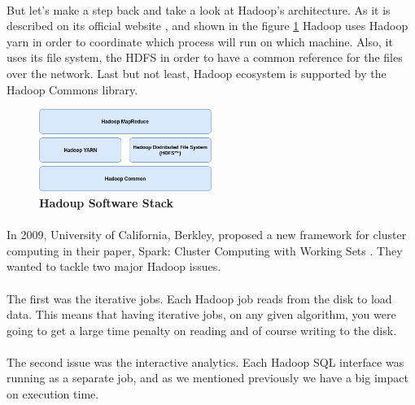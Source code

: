 \paragraph{} But let's make a step back and take a look at Hadoop's architecture. As it is described on its official website \cite{Hadoop:9}, and shown in the figure \ref{hadoopStack} Hadoop uses Hadoop yarn in order to coordinate which process will run on which machine. Also, it uses its file system, the HDFS in order to have a common reference for the files over the network. Last but not least, Hadoop ecosystem is supported by the Hadoop Commons library. \\

\begin{figure}[h]
	\centering
	\includegraphics[width=0.5\textwidth]{images/hadoop-stack.png}
	\caption{\bfseries Hadoup Software Stack}
	\label{hadoopStack}
\end{figure}

\paragraph{} In 2009, University of California, Berkley, proposed a new framework for cluster computing in their paper, Spark: Cluster Computing with Working Sets \cite{Zaharia:2010:SCC:1863103.1863113}. They wanted to tackle two major Hadoop issues. 

\paragraph{}The first was the iterative jobs. Each Hadoop job reads from the disk to load data. This means that having iterative jobs, on any given algorithm, you were going to get a large time penalty on reading and of course writing to the disk. 

\paragraph{}The second issue was the interactive analytics. Each Hadoop SQL interface was running as a separate job, and as we mentioned previously we have a big impact on execution time.

